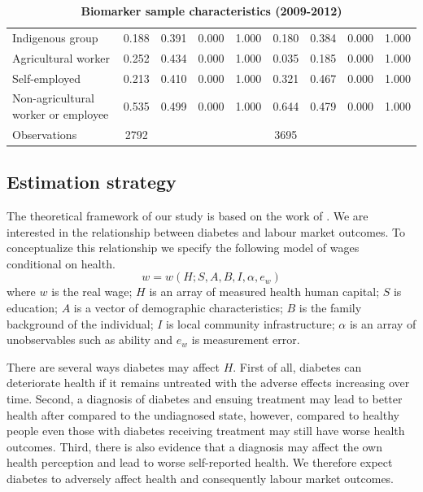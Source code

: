 \documentclass[12pt,english,british]{article}
\begin{document}
\begin{table}[h!]
\begin{center}
{{\begin{tabular}{l*{2}{cccc}}
Indigenous group    &       0.188&       0.391&       0.000&       1.000&       0.180&       0.384&       0.000&       1.000\\
Agricultural worker &       0.252&       0.434&       0.000&       1.000&       0.035&       0.185&       0.000&       1.000\\
Self-employed       &       0.213&       0.410&       0.000&       1.000&       0.321&       0.467&       0.000&       1.000\\
Non-agricultural worker or employee&       0.535&       0.499&       0.000&       1.000&       0.644&       0.479&       0.000&       1.000\\
\midrule
Observations        &        2792&            &            &            &        3695&            &            &            \\
\bottomrule
\end{tabular}%
}
}
\end{center}
\caption{\label{tab:Biomarker-sample-characteristics}\textbf{Biomarker sample characteristics
(2009-2012) }}
\end{table}  
  

\subsection{\label{sec:Estimation_Strategy}Estimation strategy}
  
The theoretical framework of our study is based on the work of \citet{Strauss1998}. We are interested in the relationship between diabetes and labour market outcomes. To conceptualize this relationship we specify the following model of wages conditional on health.
\begin{equation}
w=w(H;S,A,B,I,\alpha,e_{w})\label{eq:wage}
\end{equation}
where $w$ is the real wage; $H$ is an array of measured health human capital; $S$ is education; $A$ is a vector of demographic characteristics; $B$ is the family background of the individual; $I$ is local community infrastructure; $\alpha$ is an array of unobservables such as ability and $e_w$ is measurement error. 

There are several ways diabetes may affect $H$. First of all, diabetes can deteriorate health if it remains untreated with the adverse effects increasing over time. Second, a diagnosis of diabetes and ensuing treatment may lead to better health after compared to the undiagnosed state, however, compared to healthy people even those with diabetes receiving treatment may still have worse health outcomes. Third, there is also evidence that a diagnosis may affect the own health perception and lead to worse self-reported health. We therefore expect diabetes to adversely affect health and consequently labour market outcomes.
\end{document}
